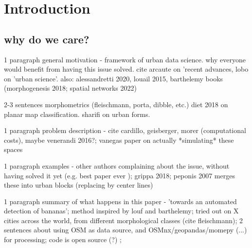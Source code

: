 \section{Introduction}
\label{sec:intro}

\subsection{why do we care?}

1 paragraph general motivation - framework of urban data science. why everyone would benefit from having this issue solved. cite arcaute on 'recent advances, lobo on 'urban science'. also: alessandretti 2020, louail 2015, barthelemy books (morphogenesis 2018; spatial networks 2022)

2-3 sentences morphometrics (fleischmann, porta, dibble, etc.) diet 2018 on planar map classification. sharifi on urban forms.

1 paragraph problem description - cite cardillo, geisberger, morer (computational costs), maybe venerandi 2016?; vanegas paper on actually *simulating* these spaces

1 paragraph examples - other authors complaining about the issue, without having solved it yet (e.g. best paper ever \citep{vybornova2022automated}); grippa 2018; peponis 2007 merges these into urban blocks (replacing by center lines)

1 paragraph summary of what happens in this paper - 'towards an automated detection of bananas'; 
method inspired by louf and barthelemy;
tried out on X cities across the world, 
from different morphological classes (cite fleischmann);
2 sentences about using OSM as data source, and OSMnx/geopandas/momepy (...) for processing;
code is open source (?) ;